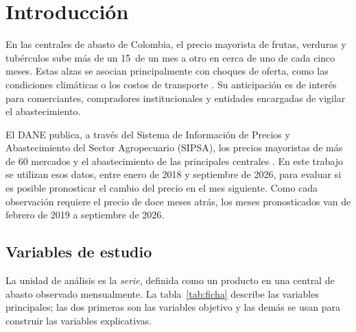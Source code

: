 \chapter{Introducción}
\label{cap:intro}

En las centrales de abasto de Colombia, el precio mayorista de frutas, verduras y tubérculos sube más de un 15\pct\ de un mes a otro en cerca de uno de cada cinco meses. Estas alzas se asocian principalmente con choques de oferta, como las condiciones climáticas o los costos de transporte \citep{gafaro2020,bohorquez2026}. Su anticipación es de interés para comerciantes, compradores institucionales y entidades encargadas de vigilar el abastecimiento.

El DANE publica, a través del Sistema de Información de Precios y Abastecimiento del Sector Agropecuario (SIPSA), los precios mayoristas de más de 60 mercados y el abastecimiento de las principales centrales \citep{dane,danebol2026}. En este trabajo se utilizan esos datos, entre enero de 2018 y septiembre de 2026, para evaluar si es posible pronosticar el cambio del precio en el mes siguiente. Como cada observación requiere el precio de doce meses atrás, los meses pronosticados van de febrero de 2019 a septiembre de 2026.

\section{Variables de estudio}

La unidad de análisis es la \emph{serie}, definida como un producto en una central de abasto observado mensualmente. La tabla~\ref{tab:ficha} describe las variables principales; las dos primeras son las variables objetivo y las demás se usan para construir las variables explicativas.

